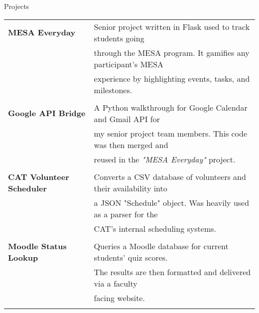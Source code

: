 \documentclass{resume} %
\begin{document}
\begin{rSection}{Projects}

\begin{tabular}{ @{} >{\bfseries}l @{\quad\quad}l }

MESA Everyday
    & Senior project written in Flask used to track students going \\
    & through the MESA program. It gamifies any participant's MESA \\
    & experience by highlighting events, tasks, and milestones. \\
    & \\
    
Google API Bridge 
    & A Python walkthrough for Google Calendar and Gmail API for \\
    & my senior project team members. This code was then merged and \\
    & reused in the \textit{"MESA Everyday"} project. \\
    & \\
    
CAT Volunteer Scheduler 
    & Converts a CSV database of volunteers and their availability into \\
    & a JSON "Schedule" object. Was heavily used as a parser for the \\
    & CAT's internal scheduling systems. \\
    & \\
    
Moodle Status Lookup
    & Queries a Moodle database for current students' quiz scores. \\
    & The results are then formatted and delivered via a faculty \\ 
    & facing website. \\
    & \\
    
\end{tabular}

\end{rSection}

\end{document}
